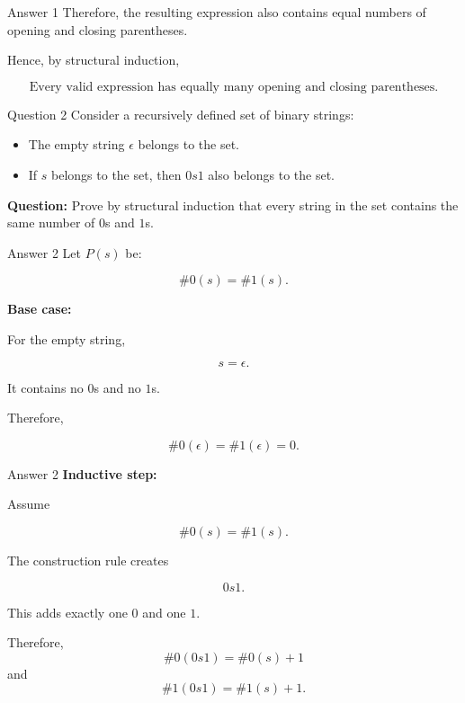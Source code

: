 \begin{frame}{Answer 1}
Therefore, the resulting expression also contains equal numbers of opening and closing parentheses.

Hence, by structural induction,

$$
\boxed{
\text{Every valid expression has equally many opening and closing parentheses.}
}
$$

\end{frame}


\begin{frame}{Question 2}
Consider a recursively defined set of binary strings:

\begin{itemize}
\item The empty string $\epsilon$ belongs to the set.
\item If $s$ belongs to the set, then $0s1$ also belongs to the set.
\end{itemize}

\textbf{Question:} Prove by structural induction that every string in the set contains the same number of $0$s and $1$s.
\end{frame}

\begin{frame}{Answer 2}
Let $P(s)$ be:

$$
\#0(s)=\#1(s).
$$

\textbf{Base case:}

For the empty string,

$$
s=\epsilon.
$$

It contains no $0$s and no $1$s.

Therefore,

$$
\#0(\epsilon)=\#1(\epsilon)=0.
$$

\end{frame}

\begin{frame}{Answer 2}
\textbf{Inductive step:}

Assume

$$
\#0(s)=\#1(s).
$$

The construction rule creates

$$
0s1.
$$

This adds exactly one $0$ and one $1$.

Therefore,
$$
\#0(0s1)=\#0(s)+1
$$
and
$$
\#1(0s1)=\#1(s)+1.
$$

\end{frame}

